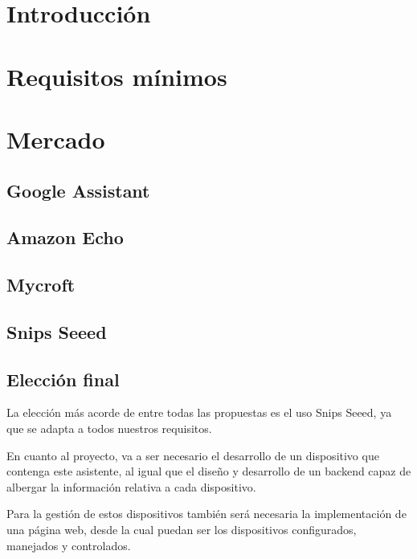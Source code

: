 \section{Introducción}


\section{Requisitos mínimos}


\section{Mercado}


    \subsection{Google Assistant}
    
    
    \subsection{Amazon Echo}
    
    
    \subsection{Mycroft}\label{Microft}
    
    
    \subsection{Snips Seeed}
    
    
    \subsection{Elección final}

La elección más acorde de entre todas las propuestas es el uso Snips Seeed, ya que se adapta a todos nuestros requisitos.

En cuanto al proyecto, va a ser necesario el desarrollo de un dispositivo que contenga este asistente, al igual que el diseño y desarrollo de un backend capaz de albergar la información relativa a cada dispositivo.

Para la gestión de estos dispositivos también será necesaria la implementación de una página web, desde la cual puedan ser los dispositivos configurados, manejados y controlados.

